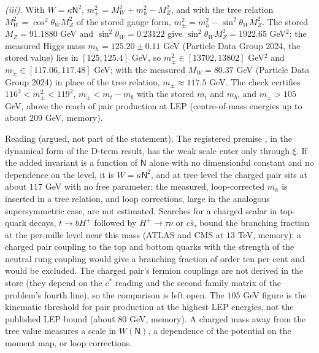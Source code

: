 \emph{(iii).} With $W = \kappa \mathsf{N}^{2}$, $m_{\pm}^{2} = M_{W}^{2} + m_{h}^{2} - M_{Z}^{2}$, and with the tree relation $M_{W}^{2} = \cos^{2}\theta_{W}M_{Z}^{2}$ of the stored gauge form, $m_{\pm}^{2} = m_{h}^{2} - \sin^{2}\theta_{W}M_{Z}^{2}$. The stored $M_{Z} = 91.1880$ GeV and $\sin^{2}\theta_{W} = 0.23122$ give $\sin^{2}\theta_{W}M_{Z}^{2} = 1922.65$ GeV$^{2}$; the measured Higgs mass $m_{h} = 125.20 \pm 0.11$ GeV (Particle Data Group 2024, the stored value) lies in $[125, 125.4]$ GeV, so $m_{\pm}^{2} \in [13702, 13802]$ GeV$^{2}$ and $m_{\pm} \in [117.06, 117.48]$ GeV; with the measured $M_{W} = 80.37$ GeV (Particle Data Group 2024) in place of the tree relation, $m_{\pm} \approx 117.5$ GeV. The check certifies $116^{2} < m_{\pm}^{2} < 119^{2}$, $m_{\pm} < m_{t} - m_{b}$ with the stored $m_{t}$ and $m_{b}$, and $m_{\pm} > 105$ GeV, above the reach of pair production at LEP (centre-of-mass energies up to about $209$ GeV, memory).

Reading (argued, not part of the statement). The registered premise , in the dynamical form of the D-term result, has the weak scale enter only through $\xi$. If the added invariant is a function of $\mathsf{N}$ alone with no dimensionful constant and no dependence on the level, it is $W = \kappa \mathsf{N}^{2}$, and at tree level the charged pair sits at about $117$ GeV with no free parameter; the measured, loop-corrected $m_{h}$ is inserted in a tree relation, and loop corrections, large in the analogous supersymmetric case, are not estimated. Searches for a charged scalar in top-quark decays, $t \to bH^{+}$ followed by $H^{+} \to \tau\nu$ or $c\bar{s}$, bound the branching fraction at the per-mille level near this mass (ATLAS and CMS at $13$ TeV, memory); a charged pair coupling to the top and bottom quarks with the strength of the neutral rung coupling would give a branching fraction of order ten per cent and would be excluded. The charged pair's fermion couplings are not derived in the store (they depend on the $c^{*}$ reading and the second family matrix of the problem's fourth line), so the comparison is left open. The $105$ GeV figure is the kinematic threshold for pair production at the highest LEP energies, not the published LEP bound (about $80$ GeV, memory). A charged mass away from the tree value measures a scale in $W(\mathsf{N})$, a dependence of the potential on the moment map, or loop corrections.
